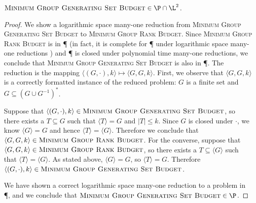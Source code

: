 \documentclass[]{article}
\newcommand{\gen}[1]{{\langle #1 \rangle}}
\begin{document}
\begin{theorem}
  $\textsc{Minimum Group Generating Set Budget} \in \P \cap \L^2$.
\end{theorem}
\begin{proof}
  We show a logarithmic space many-one reduction from \textsc{Minimum Group Generating Set Budget} to \textsc{Minimum Group Rank Budget}.
  Since \textsc{Minimum Group Rank Budget} is in \P{} (in fact, it is complete for \P{} under logarithmic space many-one reductions \cite[Problem~A.8.11]{ghr95}) and \P{} is closed under polynomial time many-one reductions, we conclude that \textsc{Minimum Group Generating Set Budget} is also in \P.
  The reduction is the mapping $\langle (G, \cdot), k \rangle \mapsto \langle G, G, k \rangle$.
  First, we observe that $\langle G, G, k \rangle$ is a correctly formatted instance of the reduced problem: $G$ is a finite set and $G \subseteq (G \cup G^{-1})^*$.

  Suppose that $\langle (G, \cdot), k \rangle \in \textsc{Minimum Group Generating Set Budget}$, so there exists a $T \subseteq G$ such that $\gen{T} = G$ and $|T| \leq k$.
  Since $G$ is closed under $\cdot$, we know $\gen{G} = G$ and hence $\gen{T} = \gen{G}$.
  Therefore we conclude that $\langle G, G, k \rangle \in \textsc{Minimum Group Rank Budget}$.
  For the converse, suppose that $\langle G, G, k \rangle \in \textsc{Minimum Group Rank Budget}$, so there exists a $T \subseteq \gen{G}$ such that $\gen{T} = \gen{G}$.
  As stated above, $\gen{G} = G$, so $\gen{T} = G$.
  Therefore $\langle (G, \cdot), k \rangle \in \textsc{Minimum Group Generating Set Budget}$.

  We have shown a correct logarithmic space many-one reduction to a problem in \P, and we conclude that $\textsc{Minimum Group Generating Set Budget} \in \P$.
\end{proof}



\end{document}
